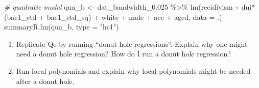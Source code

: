 \documentclass[
  11pt,
]{article}
\newenvironment{Shaded}{\begin{snugshade}}{\end{snugshade}}
\newcommand{\AttributeTok}[1]{\textcolor[rgb]{0.77,0.63,0.00}{#1}}
\newcommand{\CommentTok}[1]{\textcolor[rgb]{0.56,0.35,0.01}{\textit{#1}}}
\newcommand{\FloatTok}[1]{\textcolor[rgb]{0.00,0.00,0.81}{#1}}
\newcommand{\FunctionTok}[1]{\textcolor[rgb]{0.00,0.00,0.00}{#1}}
\newcommand{\NormalTok}[1]{#1}
\newcommand{\OtherTok}[1]{\textcolor[rgb]{0.56,0.35,0.01}{#1}}
\newcommand{\SpecialCharTok}[1]{\textcolor[rgb]{0.00,0.00,0.00}{#1}}
\newcommand{\StringTok}[1]{\textcolor[rgb]{0.31,0.60,0.02}{#1}}
\providecommand{\tightlist}{%
  \setlength{\itemsep}{0pt}\setlength{\parskip}{0pt}}
\begin{document}
\begin{Shaded}
\begin{Highlighting}[]
\CommentTok{\# quadratic model}
\NormalTok{qua\_b }\OtherTok{\textless{}{-}}
\NormalTok{  dat\_bandwidth\_0}\FloatTok{.025} \SpecialCharTok{\%\textgreater{}\%}
  \FunctionTok{lm}\NormalTok{(recidivism }\SpecialCharTok{\textasciitilde{}}\NormalTok{ dui}\SpecialCharTok{*}\NormalTok{(bac1\_ctd }\SpecialCharTok{+}\NormalTok{ bac1\_ctd\_sq) }\SpecialCharTok{+}\NormalTok{ white }\SpecialCharTok{+}\NormalTok{ male }\SpecialCharTok{+}\NormalTok{ acc }\SpecialCharTok{+}\NormalTok{ aged,}
     \AttributeTok{data =}\NormalTok{ .)}
\FunctionTok{summaryR.lm}\NormalTok{(qua\_b, }\AttributeTok{type =} \StringTok{"hc1"}\NormalTok{)}
\end{Highlighting}
\end{Shaded}

\begin{enumerate}
\def\labelenumi{\arabic{enumi}.}
\setcounter{enumi}{3}
\tightlist
\item
  Replicate Qe by running ``donut hole regressions''. Explain why one
  might need a donut hole regression? How do I run a donut hole
  regression?
\item
  Run local polynomials and explain why local polynomials might be
  needed after a donut hole.
\end{enumerate}
\end{document}
